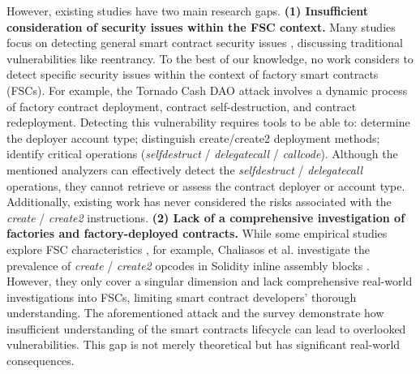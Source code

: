 \documentclass[acmsmall,screen]{acmart}
\begin{document}
	However, existing studies have two main research gaps. \textbf{(1) Insufficient consideration of security issues within the FSC context.} Many studies focus on detecting general smart contract security issues \cite{DBLP:conf/pldi/BrentGLSS20,DBLP:conf/kbse/XueMLSYP20,DBLP:conf/issta/GhalebRP22,DBLP:conf/issta/LiaoZCN22,DBLP:conf/uss/0001L21}, discussing traditional vulnerabilities like reentrancy. To the best of our knowledge, no work considers to detect specific security issues within the context of factory smart contracts (FSCs). For example, the Tornado Cash DAO attack involves a dynamic process of factory contract deployment, contract self-destruction, and contract redeployment. Detecting this vulnerability requires tools to be able to: determine the deployer account type; distinguish create/create2 deployment methods; identify critical operations (\textit{selfdestruct} / \textit{delegatecall} / \textit{callcode}). Although the mentioned analyzers can effectively detect the \textit{selfdestruct} / \textit{delegatecall} operations, they cannot retrieve or assess the contract deployer or account type. Additionally, existing work has never considered the risks associated with the \textit{create} / \textit{create2} instructions.
	\textbf{(2) Lack of a comprehensive investigation of factories and factory-deployed contracts.} While some empirical studies explore FSC characteristics \cite{DBLP:conf/sigsoft/SunXLLL23,DBLP:conf/fc/FrowisB22,DBLP:conf/fc/SalehiCM22,DBLP:journals/pacmpl/ChaliasosGL22}, for example, Chaliasos et al. investigate the prevalence of \textit{create} / \textit{create2} opcodes in Solidity inline assembly blocks \cite{DBLP:journals/pacmpl/ChaliasosGL22}. However, they only cover a singular dimension and lack comprehensive real-world investigations into FSCs, limiting smart contract developers’ thorough understanding. The aforementioned attack and the survey demonstrate how insufficient understanding of the smart contracts lifecycle can lead to overlooked vulnerabilities. This gap is not merely theoretical but has significant real-world consequences.
\end{document}
